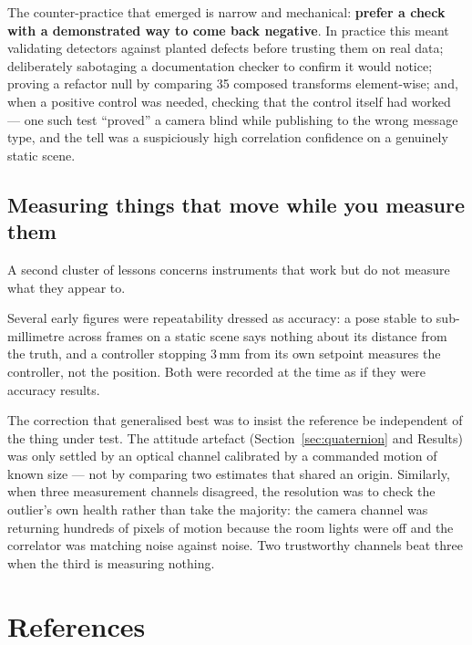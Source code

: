 \documentclass[11pt]{article}
\begin{document}
The counter-practice that emerged is narrow and mechanical: \textbf{prefer a
check with a demonstrated way to come back negative}. In practice this meant
validating detectors against planted defects before trusting them on real
data; deliberately sabotaging a documentation checker to confirm it would
notice; proving a refactor null by comparing 35 composed transforms
element-wise; and, when a positive control was needed, checking that the
control itself had worked --- one such test ``proved'' a camera blind while
publishing to the wrong message type, and the tell was a suspiciously high
correlation confidence on a genuinely static scene.

\subsection{Measuring things that move while you measure them}

A second cluster of lessons concerns instruments that work but do not
measure what they appear to.

Several early figures were repeatability dressed as accuracy: a pose stable
to sub-millimetre across frames on a static scene says nothing about its
distance from the truth, and a controller stopping 3\,mm from its own
setpoint measures the controller, not the position. Both were recorded at
the time as if they were accuracy results.

The correction that generalised best was to insist the reference be
independent of the thing under test. The attitude artefact
(Section~\ref{sec:quaternion} and Results) was only settled by an optical
channel calibrated by a commanded motion of known size --- not by comparing
two estimates that shared an origin. Similarly, when three measurement
channels disagreed, the resolution was to check the outlier's own health
rather than take the majority: the camera channel was returning hundreds of
pixels of motion because the room lights were off and the correlator was
matching noise against noise. Two trustworthy channels beat three when the
third is measuring nothing.

\section{References}
\end{document}
